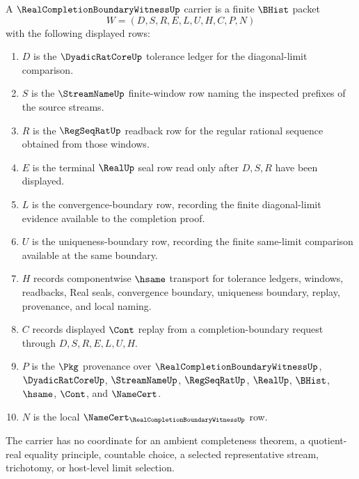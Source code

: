 \begin{definition}
\label{def:real-completion-boundary-witness-carrier}
A $\RealCompletionBoundaryWitnessUp$ carrier is a finite $\BHist$ packet
$$
W=(D,S,R,E,L,U,H,C,P,N)
$$
with the following displayed rows:
\begin{enumerate}
\item $D$ is the $\DyadicRatCoreUp$ tolerance ledger for the diagonal-limit comparison.
\item $S$ is the $\StreamNameUp$ finite-window row naming the inspected prefixes of the source streams.
\item $R$ is the $\RegSeqRatUp$ readback row for the regular rational sequence obtained from those windows.
\item $E$ is the terminal $\RealUp$ seal row read only after $D,S,R$ have been displayed.
\item $L$ is the convergence-boundary row, recording the finite diagonal-limit evidence available to the completion proof.
\item $U$ is the uniqueness-boundary row, recording the finite same-limit comparison available at the same boundary.
\item $H$ records componentwise $\hsame$ transport for tolerance ledgers, windows, readbacks, Real seals, convergence boundary, uniqueness boundary, replay, provenance, and local naming.
\item $C$ records displayed $\Cont$ replay from a completion-boundary request through $D,S,R,E,L,U,H$.
\item $P$ is the $\Pkg$ provenance over $\RealCompletionBoundaryWitnessUp$, $\DyadicRatCoreUp$, $\StreamNameUp$, $\RegSeqRatUp$, $\RealUp$, $\BHist$, $\hsame$, $\Cont$, and $\NameCert$.
\item $N$ is the local $\NameCert_{\RealCompletionBoundaryWitnessUp}$ row.
\end{enumerate}
The carrier has no coordinate for an ambient completeness theorem, a quotient-real equality principle, countable choice, a selected representative stream, trichotomy, or host-level limit selection.
\end{definition}

